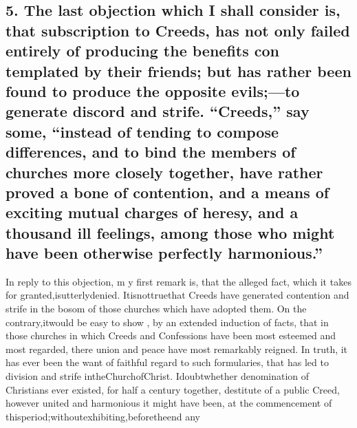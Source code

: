 \documentclass[
]{book}
\begin{document}
\hypertarget{the-last-objection-which-i-shall-consider-is-that-subscription-to-creeds-has-not-only-failed-entirely-of-producing-the-benefits-con-templated-by-their-friends-but-has-rather-been-found-to-produce-the-opposite-evilsto-generate-discord-and-strife.-creeds-say-some-instead-of-tending-to-compose-differences-and-to-bind-the-members-of-churches-more-closely-together-have-rather-proved-a-bone-of-contention-and-a-means-of-exciting-mutual-charges-of-heresy-and-a-thousand-ill-feelings-among-those-who-might-have-been-otherwise-perfectly-harmonious.}{%
\subsection{5. The last objection which I shall consider is, that subscription to Creeds, has not only failed entirely of producing the benefits con templated by their friends; but has rather been found to produce the opposite evils;---to generate discord and strife. ``Creeds,'' say some, ``instead of tending to compose differences, and to bind the members of churches more closely together, have rather proved a bone of contention, and a means of exciting mutual charges of heresy, and a thousand ill feelings, among those who might have been otherwise perfectly harmonious.''}\label{the-last-objection-which-i-shall-consider-is-that-subscription-to-creeds-has-not-only-failed-entirely-of-producing-the-benefits-con-templated-by-their-friends-but-has-rather-been-found-to-produce-the-opposite-evilsto-generate-discord-and-strife.-creeds-say-some-instead-of-tending-to-compose-differences-and-to-bind-the-members-of-churches-more-closely-together-have-rather-proved-a-bone-of-contention-and-a-means-of-exciting-mutual-charges-of-heresy-and-a-thousand-ill-feelings-among-those-who-might-have-been-otherwise-perfectly-harmonious.}}

In reply to this objection, m y first remark
is, that the alleged fact, which it takes for
granted,isutterlydenied. Itisnottruethat
Creeds have generated contention and strife
in the bosom of those churches which have
adopted them. On the contrary,itwould be easy to show , by an extended induction of
facts, that in those churches in which Creeds and Confessions have been most esteemed and
most regarded, there union and peace have most remarkably reigned. In truth, it has ever been the want of faithful regard to such formularies, that has led to division and strife intheChurchofChrist. Idoubtwhether
denomination of Christians ever existed, for
half a century together, destitute of a public Creed, however united and harmonious it
might have been, at the commencement of thisperiod;withoutexhibiting,beforetheend
any
\end{document}
